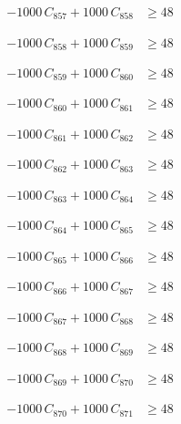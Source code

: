 \documentclass[a4paper,11pt]{article}
\begin{document}
\begin{align}
-1000\,C_{857} + 1000\,C_{858} &\geq 48 \nonumber
\end{align}

\begin{align}
-1000\,C_{858} + 1000\,C_{859} &\geq 48 \nonumber
\end{align}

\begin{align}
-1000\,C_{859} + 1000\,C_{860} &\geq 48 \nonumber
\end{align}

\begin{align}
-1000\,C_{860} + 1000\,C_{861} &\geq 48 \nonumber
\end{align}

\begin{align}
-1000\,C_{861} + 1000\,C_{862} &\geq 48 \nonumber
\end{align}

\begin{align}
-1000\,C_{862} + 1000\,C_{863} &\geq 48 \nonumber
\end{align}

\begin{align}
-1000\,C_{863} + 1000\,C_{864} &\geq 48 \nonumber
\end{align}

\begin{align}
-1000\,C_{864} + 1000\,C_{865} &\geq 48 \nonumber
\end{align}

\begin{align}
-1000\,C_{865} + 1000\,C_{866} &\geq 48 \nonumber
\end{align}

\begin{align}
-1000\,C_{866} + 1000\,C_{867} &\geq 48 \nonumber
\end{align}

\begin{align}
-1000\,C_{867} + 1000\,C_{868} &\geq 48 \nonumber
\end{align}

\begin{align}
-1000\,C_{868} + 1000\,C_{869} &\geq 48 \nonumber
\end{align}

\begin{align}
-1000\,C_{869} + 1000\,C_{870} &\geq 48 \nonumber
\end{align}

\begin{align}
-1000\,C_{870} + 1000\,C_{871} &\geq 48 \nonumber
\end{align}
\end{document}
